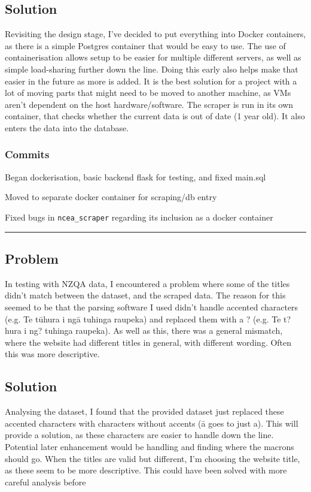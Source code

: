 \documentclass{article}
\begin{document}
\subsection*{Solution}
Revisiting the design stage, I've decided to put everything into Docker containers, as there is a simple Postgres container that would be easy to use. The use of containerisation allows setup to be easier for multiple different servers, as well as simple load-sharing further down the line. Doing this early also helps make that easier in the future as more is added. It is the best solution for a project with a lot of moving parts that might need to be moved to another machine, as VMs aren't dependent on the host hardware/software. The scraper is run in its own container, that checks whether the current data is out of date (1 year old). It also enters the data into the database.

\subsubsection*{Commits}
\begin{description}\small
    \item[\texttt{de3330a}] Began dockerisation, basic backend flask for testing, and fixed main.sql
    \item[\texttt{fc5bade0}] Moved to separate docker container for scraping/db entry
    \item[\texttt{f24617b}] Fixed bugs in \texttt{ncea\_scraper} regarding its inclusion as a docker container
\end{description}
\normalfont
\begin{center}
\rule{0.5\textwidth}{0.2pt}
\end{center}

\subsection*{Problem}
In testing with NZQA data, I encountered a problem where some of the titles didn't match between the dataset, and the scraped data. The reason for this seemed to be that the parsing software I used didn't handle accented characters (e.g. Te t\={u}hura i ng\={a} tuhinga raupeka) and replaced them with a ? (e.g. Te t?hura i ng? tuhinga raupeka). As well as this, there was a general mismatch, where the website had different titles in general, with different wording. Often this was more descriptive.
\subsection*{Solution}
Analysing the dataset, I found that the provided dataset just replaced these accented characters with characters without accents (\={a} goes to just a). This will provide a solution, as these characters are easier to handle down the line. Potential later enhancement would be handling and finding where the macrons should go. When the titles are valid but different, I'm choosing the website title, as these seem to be more descriptive. This could have been solved with more careful analysis before 
\end{document}
